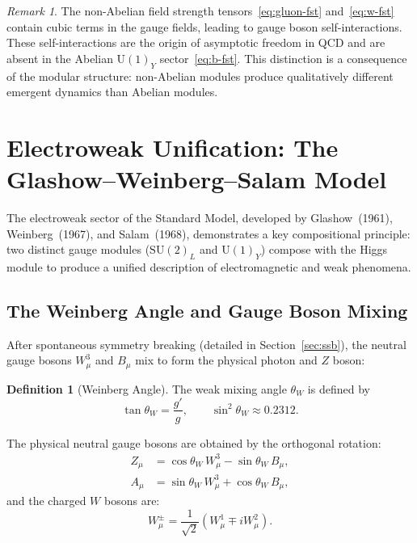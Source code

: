\documentclass[12pt]{article}
\theoremstyle{definition}
\newtheorem{definition}[theorem]{Definition}
\theoremstyle{remark}
\newtheorem{remark}[theorem]{Remark}
\newcommand{\su}[1]{\mathrm{SU}(#1)}
\newcommand{\uu}[1]{\mathrm{U}(#1)}
\newcommand{\sinw}{\sin^2\!\theta_W}
\newcommand{\cosw}{\cos\theta_W}
\begin{document}
\begin{remark}
The non-Abelian field strength tensors~\eqref{eq:gluon-fst} and~\eqref{eq:w-fst} contain cubic terms in the gauge fields, leading to gauge boson self-interactions. These self-interactions are the origin of asymptotic freedom in QCD and are absent in the Abelian $\uu{1}_Y$ sector~\eqref{eq:b-fst}. This distinction is a consequence of the modular structure: non-Abelian modules produce qualitatively different emergent dynamics than Abelian modules.
\end{remark}


\section{Electroweak Unification: The Glashow--Weinberg--Salam Model}
\label{sec:electroweak}

The electroweak sector of the Standard Model, developed by Glashow~(1961), Weinberg~(1967), and Salam~(1968), demonstrates a key compositional principle: two distinct gauge modules ($\su{2}_L$ and $\uu{1}_Y$) compose with the Higgs module to produce a unified description of electromagnetic and weak phenomena.

\subsection{The Weinberg Angle and Gauge Boson Mixing}

After spontaneous symmetry breaking (detailed in Section~\ref{sec:ssb}), the neutral gauge bosons $W^3_\mu$ and $B_\mu$ mix to form the physical photon and $Z$ boson:

\begin{definition}[Weinberg Angle]
\label{def:weinberg-angle}
The weak mixing angle $\theta_W$ is defined by
\begin{equation}
\label{eq:weinberg-angle}
\tan\theta_W = \frac{g'}{g}, \qquad \sinw \approx 0.2312.
\end{equation}
\end{definition}

The physical neutral gauge bosons are obtained by the orthogonal rotation:
\begin{align}
Z_\mu &= \cosw \, W^3_\mu - \sin\theta_W \, B_\mu, \label{eq:z-boson} \\
A_\mu &= \sin\theta_W \, W^3_\mu + \cosw \, B_\mu, \label{eq:photon}
\end{align}
and the charged $W$ bosons are:
\begin{equation}
\label{eq:w-pm}
W^\pm_\mu = \frac{1}{\sqrt{2}} \left( W^1_\mu \mp i W^2_\mu \right).
\end{equation}
\end{document}
